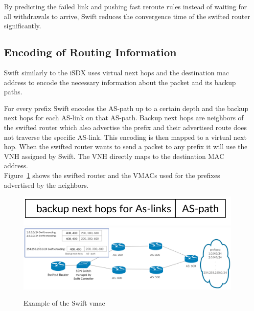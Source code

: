 By predicting the failed link and pushing fast reroute rules instead of waiting for all withdrawals to arrive, Swift reduces the convergence time of the swifted router significantly.

\subsection{\label{chapter2:Swift:encoding_of_routing_information}Encoding of Routing Information}
Swift similarly to the iSDX uses virtual next hops and the destination mac address to encode the necessary information about the packet and its backup paths.

For every prefix Swift encodes the AS-path up to a certain depth and the backup next hops for each AS-link on that AS-path. Backup next hops are neighbors of the swifted router which also advertise the prefix and their advertised route does not traverse the specific AS-link. This encoding is then mapped to a virtual next hop. When the swifted router wants to send a packet to any prefix it will use the VNH assigned by Swift. The VNH directly maps to the destination MAC address. \\
Figure~\ref{fig:swift_vmac} shows the swifted router and the VMACs used for the prefixes advertised by the neighbors.

\begin{figure}[h]
\center
\includegraphics[scale = 0.6]{Figures/bckgrnd_swift_vmac_cropped.pdf}
\includegraphics[scale = 0.24]{Figures/bckgrnd_swift_topology.pdf}
\caption{Example of the Swift vmac}
\label{fig:swift_vmac}
\end{figure}








